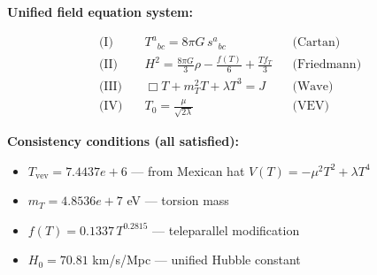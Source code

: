 
\textbf{Unified field equation system:}

\begin{align}
  \text{(I)} \quad & T^a{}_{bc} = 8\pi G \, s^a{}_{bc} && \text{(Cartan)} \\
  \text{(II)} \quad & H^2 = \frac{8\pi G}{3}\rho - \frac{f(T)}{6} + \frac{Tf_T}{3} && \text{(Friedmann)} \\
  \text{(III)} \quad & \Box T + m_T^2 T + \lambda T^3 = J && \text{(Wave)} \\
  \text{(IV)} \quad & T_0 = \frac{\mu}{\sqrt{2\lambda}} && \text{(VEV)}
\end{align}

\textbf{Consistency conditions (all satisfied):}
\begin{itemize}
  \item $T_{\text{vev}} = 7.4437e+6$ — from Mexican hat $V(T) = -\mu^2 T^2 + \lambda T^4$
  \item $m_T = 4.8536e+7$ eV — torsion mass
  \item $f(T) = 0.1337 \, T^{0.2815}$ — teleparallel modification
  \item $H_0 = 70.81$ km/s/Mpc — unified Hubble constant
\end{itemize}